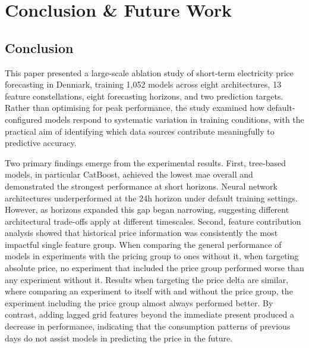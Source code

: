 \section{Conclusion \& Future Work}\label{sec:conclusion&future-works}
\subsection{Conclusion}
This paper presented a large-scale ablation study of short-term electricity 
price forecasting in Denmark, training 1,052
models across eight architectures, 13 feature constellations,
eight forecasting horizons, and two prediction targets. Rather
than optimising for peak performance, the study examined how
default-configured models respond to systematic variation in
training conditions, with the practical aim of identifying which
data sources contribute meaningfully to predictive accuracy.

Two primary findings emerge from the experimental results.
First, tree-based models, in particular CatBoost, achieved
the lowest \gls{mae} overall and demonstrated the strongest
performance at short horizons. Neural network architectures
underperformed at the 24h horizon under default training
settings. However, as horizons expanded this gap began
narrowing, suggesting different architectural trade-offs apply at different 
timescales. Second, feature contribution analysis
showed that historical price information was consistently the
most impactful single feature group. When comparing the
general performance of models in experiments with the pricing
group to ones without it, when targeting absolute price, no
experiment that included the price group performed worse than
any experiment without it. Results when targeting the price
delta are similar, where comparing an experiment to itself with
and without the price group, the experiment including the price
group almost always performed better. By contrast, adding
lagged grid features beyond the immediate present produced
a decrease in performance, indicating that the consumption
patterns of previous days do not assist models in predicting
the price in the future.


